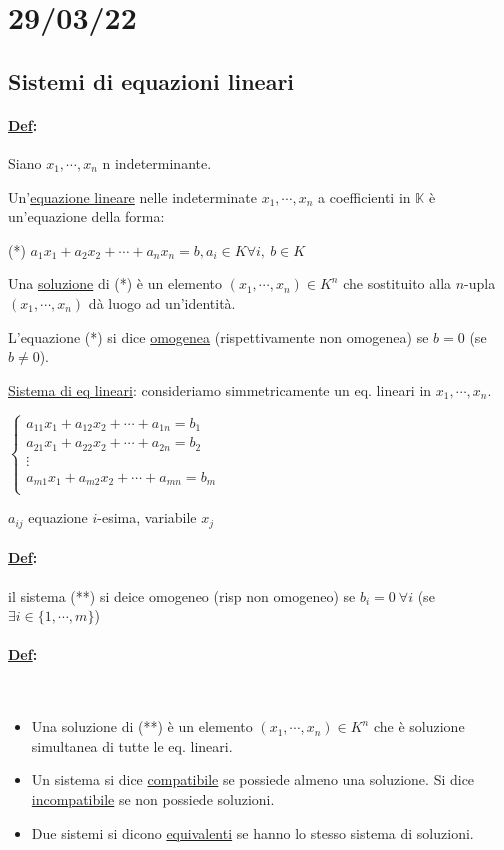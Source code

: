 \documentclass{article}
\newcommand{\ul}[1]{\underline{#1}}
\newcommand{\K}{\mathbb{K}}
\newcommand{\Def}[2]{\paragraph{\ul{Def}:}#1\\\hspace*{3em}\begin{minipage}{.8\textwidth}#2\end{minipage}}
\begin{document}
\section{29/03/22}
\subsection{Sistemi di equazioni lineari}
\Def{Siano $x_1,\cdots,x_n$ n indeterminante.}{
	Un'\ul{equazione lineare} nelle indeterminate $x_1,\cdots,x_n$ a coefficienti in $\K$ è un'equazione della forma:

	(*) $a_1x_1+a_2x_2+\cdots+a_nx_n=b, a_i\in K\forall i,\ b\in K$

	Una \ul{soluzione} di (*) è un elemento $(x_1,\cdots,x_n)\in K^n$ che sostituito alla $n$-upla $(x_1,\cdots,x_n)$ dà luogo ad un'identità.

	L'equazione (*) si dice \ul{omogenea} (rispettivamente non omogenea) se $b=0$ (se $b\not=0$).
}
\vspace*{1em}

\ul{Sistema di eq lineari}: consideriamo simmetricamente un eq. lineari in $x_1,\cdots,x_n$.

$\begin{cases}
	a_{11}x_1+a_{12}x_2+\cdots+a_{1n}=b_1 \\
	a_{21}x_1+a_{22}x_2+\cdots+a_{2n}=b_2 \\
	\vdots                                \\
	a_{m1}x_1+a_{m2}x_2+\cdots+a_{mn}=b_m \\
\end{cases}$

$a_{ij}$ equazione $i$-esima, variabile $x_j$

\Def{il sistema (**) si deice omogeneo (risp non omogeneo) se $b_i=0\ \forall i$ (se $\exists i\in\{1,\cdots,m\}$)}{}

\Def{\text{}}{
	\begin{itemize}
		\item Una soluzione di (**) è un elemento $(x_1,\cdots,x_n)\in K^n$ che è soluzione simultanea di tutte le eq. lineari.
		\item Un sistema si dice \ul{compatibile} se possiede almeno una soluzione. Si dice \ul{incompatibile} se non possiede soluzioni.
		\item Due sistemi si dicono \ul{equivalenti} se hanno lo stesso sistema di soluzioni.
	\end{itemize}
}
\end{document}

